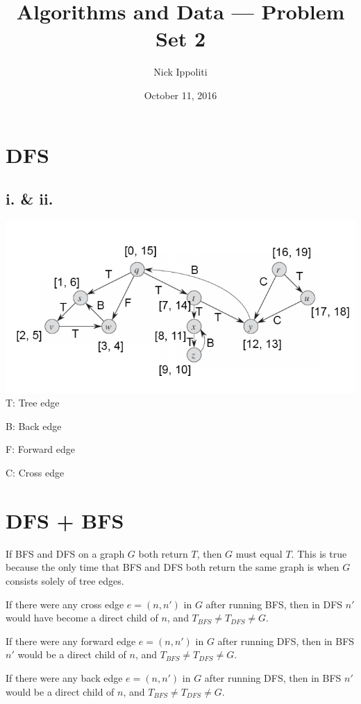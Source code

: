\documentclass[14pt, letterpaper]{article}
\title{Algorithms and Data --- Problem Set 2}
\author{Nick Ippoliti}
\date{October 11, 2016}
\begin{document}
\begin{titlepage}
\maketitle
\end{titlepage}

\section{DFS}
\subsection{i. \& ii.}
\includegraphics[width=\textwidth]{graph1}
T: Tree edge

B: Back edge

F: Forward edge

C: Cross edge

\section{DFS + BFS}
If BFS and DFS on a graph $G$ both return $T$, then $G$ must equal $T$. This is
true because the only time that BFS and DFS both return the same graph is when
$G$ consists solely of tree edges.

If there were any cross edge $e = (n, n')$ in $G$ after running BFS, then in 
DFS $n'$ would have become a direct child of $n$, and $T_{BFS} \neq T_{DFS} \neq G$.

If there were any forward edge $e = (n, n')$ in $G$ after running DFS, then in 
BFS $n'$ would be a direct child of $n$, and $T_{BFS} \neq T_{DFS} \neq G$.

If there were any back edge $e = (n, n')$ in $G$ after running DFS, then in
BFS $n'$ would be a direct child of $n$, and $T_{BFS} \neq T_{DFS} \neq G$.

\section{}
\end{document}
